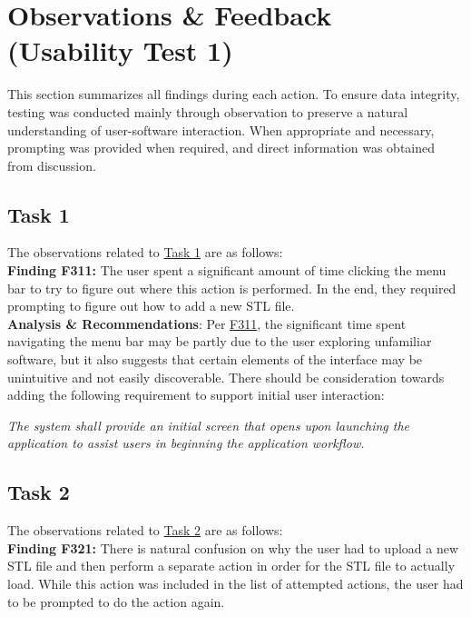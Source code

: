 \documentclass{article}
\begin{document}
\section{Observations \& Feedback (Usability Test 1)}

This section summarizes all findings during each action. To ensure data integrity, testing was conducted mainly through observation to preserve a natural understanding of user-software interaction. When appropriate and necessary, prompting was provided when required, and direct information was obtained from discussion.

\subsection{Task 1}

\noindent The observations related to \hyperlink{task:T1}{Task 1} are as follows:\\

\noindent \hypertarget{finding:F311}{\textbf{Finding F311:}} 
The user spent a significant amount of time clicking the menu bar to try to figure out where this action is performed. In the end, they required prompting to figure out how to add a new STL file.\\ 

\noindent \textbf{Analysis \& Recommendations}: Per \hyperlink{finding:F331}{F311}, the significant time spent navigating the menu bar may be partly due to the user exploring unfamiliar software, but it also suggests that certain elements of the interface may be unintuitive and not easily discoverable. There should be consideration towards adding the following requirement to support initial user interaction:

\begin{center}
  \textit{The system shall provide an initial screen that opens upon launching the application to assist users in beginning the application workflow.}
\end{center}


\subsection{Task 2}

\noindent The observations related to \hyperlink{task:T2}{Task 2} are as follows:\\

\noindent \hypertarget{finding:F321}{\textbf{Finding F321:}} 
There is natural confusion on why the user had to upload a new STL file and then perform a separate action in order for the STL file to actually load. While this action was included in the list of attempted actions, the user had to be prompted to do the action again. \\ 
\end{document}

